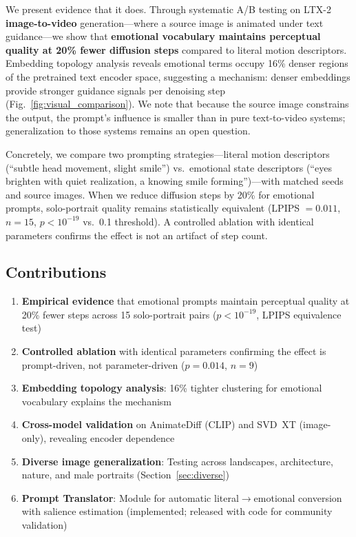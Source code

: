 \documentclass[10pt,twocolumn,letterpaper]{article}
\begin{document}
We present evidence that it does. Through systematic A/B testing on LTX-2 \textbf{image-to-video} generation---where a source image is animated under text guidance---we show that \textbf{emotional vocabulary maintains perceptual quality at 20\% fewer diffusion steps} compared to literal motion descriptors. Embedding topology analysis reveals emotional terms occupy 16\% denser regions of the pretrained text encoder space, suggesting a mechanism: denser embeddings provide stronger guidance signals per denoising step (Fig.~\ref{fig:visual_comparison}). We note that because the source image constrains the output, the prompt's influence is smaller than in pure text-to-video systems; generalization to those systems remains an open question.

Concretely, we compare two prompting strategies---literal motion descriptors (``subtle head movement, slight smile'') vs.\ emotional state descriptors (``eyes brighten with quiet realization, a knowing smile forming'')---with matched seeds and source images. When we reduce diffusion steps by 20\% for emotional prompts, solo-portrait quality remains statistically equivalent (LPIPS $= 0.011$, $n{=}15$, $p < 10^{-19}$ vs.\ 0.1 threshold). A controlled ablation with identical parameters confirms the effect is not an artifact of step count.

\subsection{Contributions}

\begin{enumerate}
    \item \textbf{Empirical evidence} that emotional prompts maintain perceptual quality at 20\% fewer steps across 15 solo-portrait pairs ($p < 10^{-19}$, LPIPS equivalence test)
    \item \textbf{Controlled ablation} with identical parameters confirming the effect is prompt-driven, not parameter-driven ($p = 0.014$, $n=9$)
    \item \textbf{Embedding topology analysis}: 16\% tighter clustering for emotional vocabulary explains the mechanism
    \item \textbf{Cross-model validation} on AnimateDiff (CLIP) and SVD~XT (image-only), revealing encoder dependence
    \item \textbf{Diverse image generalization}: Testing across landscapes, architecture, nature, and male portraits (Section~\ref{sec:diverse})
    \item \textbf{Prompt Translator}: Module for automatic literal$\rightarrow$emotional conversion with salience estimation (implemented; released with code for community validation)
\end{enumerate}
\end{document}
